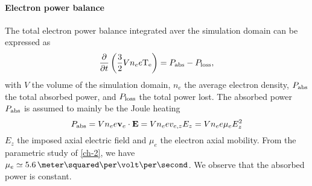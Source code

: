     
    \paragraph{Electron power balance\\}
    The total electron power balance integrated aver the simulation domain can be expressed as
    \begin{equation} \label{eq-GMel}
      \frac{\partial }{\partial t} \left( \frac{3}{2} V n_e e \mathrm{T_e} \right) = P_{\rm abs} - P_{\rm loss},
    \end{equation}
    with $V$ the  volume of the simulation domain, $n_e$ the average electron density,  $P_{\rm abs}$ the total absorbed power, and $P_{\rm loss}$ the total power lost.
    The absorbed power $P_{\rm abs}$ is assumed to mainly be the Joule heating
    \begin{equation} \label{eq-pabs}
      P_{\rm abs} = V n_e e {\mathbf v_e} \cdot {\mathbf E} = V n_e e v_{e, z} E_z = V n_e e \mu_e  E_z^2
    \end{equation}
    $E_z$ the imposed axial electric field and $\mu_e$ the electron axial mobility.
    From the parametric study of \cref{ch-2}, we have $\mu_e \simeq 5.6 \,\meter\squared\per\volt\per\second$.
    We observe that the absorbed power is constant.
    
